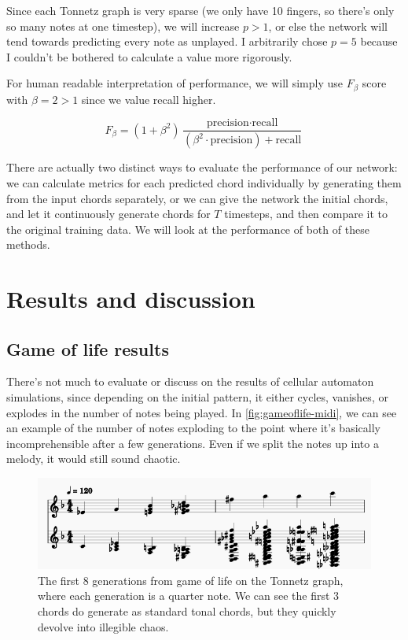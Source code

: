 \documentclass[
	a4paper, %
	10pt, %
	unnumberedsections, %
	twoside, %
]{LTJournalArticle}
\begin{document}
Since each Tonnetz graph is very sparse (we only have 10 fingers, so there's only so many notes at one timestep), we will increase $p>1$, or else the network will tend towards predicting every note as unplayed. I arbitrarily chose $p=5$ because I couldn't be bothered to calculate a value more rigorously.

For human readable interpretation of performance, we will simply use $F_\beta$ score with $\beta=2>1$ since we value recall higher.

\begin{equation}
    F_\beta = (1+\beta^2)\frac{\text{precision}\cdot\text{recall}}{(\beta^2\cdot\text{precision})+\text{recall}}
\end{equation}

There are actually two distinct ways to evaluate the performance of our network: we can calculate metrics for each predicted chord individually by generating them from the input chords separately, or we can give the network the initial chords, and let it continuously generate chords for $T$ timesteps, and then compare it to the original training data. We will look at the performance of both of these methods.

\section{Results and discussion}

\subsection{Game of life results}

There's not much to evaluate or discuss on the results of cellular automaton simulations, since depending on the initial pattern, it either cycles, vanishes, or explodes in the number of notes being played. In \autoref{fig:gameoflife-midi}, we can see an example of the number of notes exploding to the point where it's basically incomprehensible after a few generations. Even if we split the notes up into a melody, it would still sound chaotic.

\begin{figure}
    \centering
    \includegraphics[width=0.7\linewidth]{images/gameoflife-midi.png}
    \caption{The first 8 generations from game of life on the Tonnetz graph, where each generation is a quarter note. We can see the first 3 chords do generate as standard tonal chords, but they quickly devolve into illegible chaos.}
    \label{fig:gameoflife-midi}
\end{figure}
\end{document}
